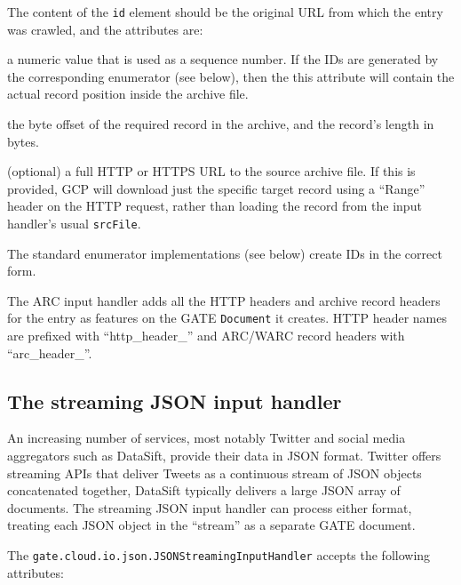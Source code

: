 The content of the \verb!id! element should be the original URL from which the
entry was crawled, and the attributes are:
\bde
\item[recordPosition] a numeric value that
 is used as a sequence number. If the IDs are generated by the corresponding
 enumerator (see below), then the this attribute will contain the actual
 record position inside the archive file.
\item[recordOffset and recordLength] the byte offset of the required record in
  the archive, and the record's length in bytes.
\item[url] (optional) a full HTTP or HTTPS URL to the source archive file.  If
  this is provided, GCP will download just the specific target record using a
  ``Range'' header on the HTTP request, rather than loading the record from the
  input handler's usual \verb!srcFile!.
\ede

The standard enumerator implementations (see below) create IDs in the correct
form.

The ARC input handler adds all the HTTP headers and archive record headers for
the entry as features on the GATE \verb!Document! it creates.  HTTP header
names are prefixed with ``http\_header\_'' and ARC/WARC record headers with
``arc\_header\_''.

\subsection{The streaming JSON input handler}
\label{sec:batch-def:json-input}

An increasing number of services, most notably Twitter and social media
aggregators such as DataSift, provide their data in JSON format.  Twitter
offers streaming APIs that deliver Tweets as a continuous stream of JSON
objects concatenated together, DataSift typically delivers a large JSON array
of documents.  The streaming JSON input handler can process either format,
treating each JSON object in the ``stream'' as a separate GATE document.

The \verb!gate.cloud.io.json.JSONStreamingInputHandler! accepts the following
attributes:

